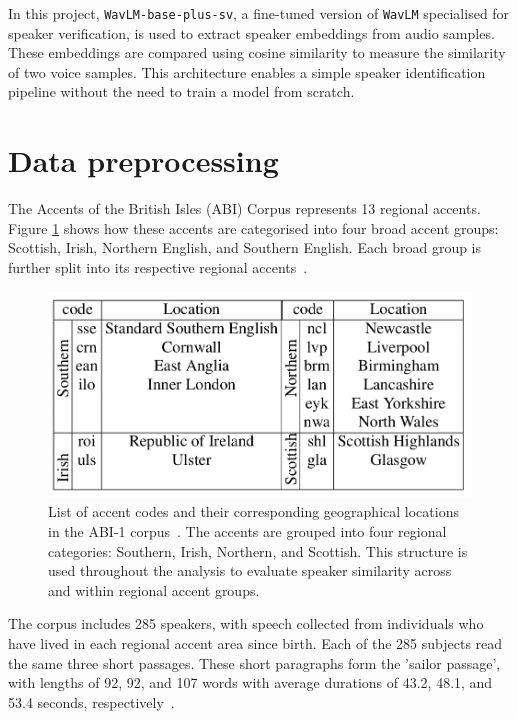 \documentclass[conference]{IEEEtran}
\begin{document}
	In this project, \texttt{WavLM-base-plus-sv}, a fine-tuned version of \texttt{WavLM} specialised for speaker verification, is used to extract speaker embeddings from audio samples. These embeddings are compared using cosine similarity to measure the similarity of two voice samples. This architecture enables a simple speaker identification pipeline without the need to train a model from scratch.
	
	
	\section{Data preprocessing}
	\label{sec:data-processing}
	
	The Accents of the British Isles (ABI) Corpus represents 13 regional accents. Figure \ref{fig:img-abi-corpus-accents} shows how these accents are categorised into four broad accent groups: Scottish, Irish, Northern English, and Southern English. Each broad group is further split into its respective regional accents~\cite{najafian2016improving}.
	
	\begin{figure}[H]
		\centering
		\includegraphics[width=1\linewidth]{img/img-abi-corpus-accents}
		\caption{List of accent codes and their corresponding geographical locations in the ABI-1 corpus~\cite{najafian2016improving}. The accents are grouped into four regional categories: Southern, Irish, Northern, and Scottish. This structure is used throughout the analysis to evaluate speaker similarity across and within regional accent groups.}
		\label{fig:img-abi-corpus-accents}
	\end{figure}
	
	The corpus includes 285 speakers, with speech collected from individuals who have lived in each regional accent area since birth. Each of the 285 subjects read the same three short passages. These short paragraphs form the 'sailor passage', with lengths of 92, 92, and 107 words with average durations of 43.2, 48.1, and 53.4 seconds, respectively~\cite{najafian2016improving}.
	
\end{document}
